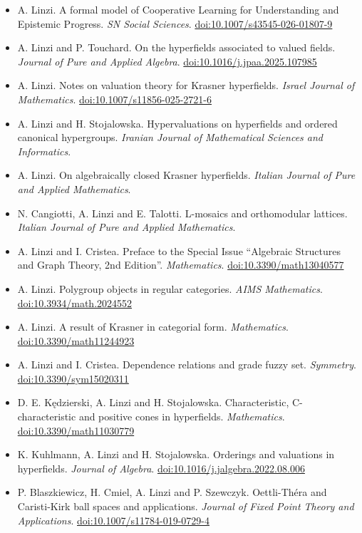\documentclass[10pt,a4paper]{article}
\begin{document}
\begin{itemize}[leftmargin=3em,labelwidth=2.4em,labelsep=0.6em,align=left]
  \item[2026] A. Linzi. A formal model of Cooperative Learning for Understanding and Epistemic Progress. \emph{SN Social Sciences}. \href{https://doi.org/10.1007/s43545-026-01807-9}{doi:10.1007/s43545-026-01807-9}
  \item[2025] A. Linzi and P. Touchard. On the hyperfields associated to valued fields. \emph{Journal of Pure and Applied Algebra}. \href{https://doi.org/10.1016/j.jpaa.2025.107985}{doi:10.1016/j.jpaa.2025.107985}
  \item[2025] A. Linzi. Notes on valuation theory for Krasner hyperfields. \emph{Israel Journal of Mathematics}. \href{https://doi.org/10.1007/s11856-025-2721-6}{doi:10.1007/s11856-025-2721-6}
  \item[2025] A. Linzi and H. Stojalowska. Hypervaluations on hyperfields and ordered canonical hypergroups. \emph{Iranian Journal of Mathematical Sciences and Informatics}.
  \item[2025] A. Linzi. On algebraically closed Krasner hyperfields. \emph{Italian Journal of Pure and Applied Mathematics}.
  \item[2025] N. Cangiotti, A. Linzi and E. Talotti. L-mosaics and orthomodular lattices. \emph{Italian Journal of Pure and Applied Mathematics}.
  \item[2025] A. Linzi and I. Cristea. Preface to the Special Issue ``Algebraic Structures and Graph Theory, 2nd Edition''. \emph{Mathematics}. \href{https://doi.org/10.3390/math13040577}{doi:10.3390/math13040577}
  \item[2024] A. Linzi. Polygroup objects in regular categories. \emph{AIMS Mathematics}. \href{https://doi.org/10.3934/math.2024552}{doi:10.3934/math.2024552}
  \item[2023] A. Linzi. A result of Krasner in categorial form. \emph{Mathematics}. \href{https://doi.org/10.3390/math11244923}{doi:10.3390/math11244923}
  \item[2023] A. Linzi and I. Cristea. Dependence relations and grade fuzzy set. \emph{Symmetry}. \href{https://doi.org/10.3390/sym15020311}{doi:10.3390/sym15020311}
  \item[2023] D. E. K\k{e}dzierski, A. Linzi and H. Stojalowska. Characteristic, C-characteristic and positive cones in hyperfields. \emph{Mathematics}. \href{https://doi.org/10.3390/math11030779}{doi:10.3390/math11030779}
  \item[2022] K. Kuhlmann, A. Linzi and H. Stojalowska. Orderings and valuations in hyperfields. \emph{Journal of Algebra}. \href{https://doi.org/10.1016/j.jalgebra.2022.08.006}{doi:10.1016/j.jalgebra.2022.08.006}
  \item[2019] P. Blaszkiewicz, H. Cmiel, A. Linzi and P. Szewczyk. Oettli-Th\'era and Caristi-Kirk ball spaces and applications. \emph{Journal of Fixed Point Theory and Applications}. \href{https://doi.org/10.1007/s11784-019-0729-4}{doi:10.1007/s11784-019-0729-4}
\end{itemize}
\end{document}
